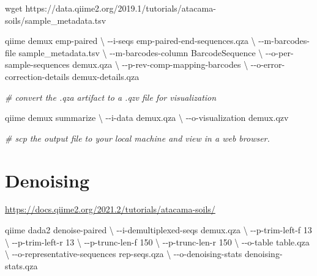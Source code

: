 \documentclass[
]{book}
\newenvironment{Shaded}{\begin{snugshade}}{\end{snugshade}}
\newcommand{\CommentTok}[1]{\textcolor[rgb]{0.56,0.35,0.01}{\textit{#1}}}
\newcommand{\DataTypeTok}[1]{\textcolor[rgb]{0.13,0.29,0.53}{#1}}
\newcommand{\ExtensionTok}[1]{#1}
\newcommand{\FunctionTok}[1]{\textcolor[rgb]{0.00,0.00,0.00}{#1}}
\newcommand{\NormalTok}[1]{#1}
\begin{document}
\begin{Shaded}
\begin{Highlighting}[]
\FunctionTok{wget}\NormalTok{ https://data.qiime2.org/2019.1/tutorials/atacama{-}soils/sample\_metadata.tsv}

\ExtensionTok{qiime}\NormalTok{ demux emp{-}paired }\DataTypeTok{\textbackslash{}}
\NormalTok{{-}{-}i{-}seqs emp{-}paired{-}end{-}sequences.qza }\DataTypeTok{\textbackslash{}}
\NormalTok{{-}{-}m{-}barcodes{-}file sample\_metadata.tsv }\DataTypeTok{\textbackslash{}}
\NormalTok{{-}{-}m{-}barcodes{-}column BarcodeSequence }\DataTypeTok{\textbackslash{}}
\NormalTok{{-}{-}o{-}per{-}sample{-}sequences demux.qza }\DataTypeTok{\textbackslash{}}
\NormalTok{{-}{-}p{-}rev{-}comp{-}mapping{-}barcodes }\DataTypeTok{\textbackslash{}}
\NormalTok{{-}{-}o{-}error{-}correction{-}details demux{-}details.qza}

\CommentTok{\# convert the .qza artifact to a .qzv file for visualization}

\ExtensionTok{qiime}\NormalTok{ demux summarize }\DataTypeTok{\textbackslash{}}
\NormalTok{{-}{-}i{-}data demux.qza }\DataTypeTok{\textbackslash{}}
\NormalTok{{-}{-}o{-}visualization demux.qzv}

\CommentTok{\# scp the output file to your local machine and view in a web browser.}
\end{Highlighting}
\end{Shaded}

\hypertarget{denoising}{%
\section{Denoising}\label{denoising}}

\url{https://docs.qiime2.org/2021.2/tutorials/atacama-soils/}

\begin{Shaded}
\begin{Highlighting}[]
\ExtensionTok{qiime}\NormalTok{ dada2 denoise{-}paired }\DataTypeTok{\textbackslash{} }  
\ExtensionTok{{-}{-}i{-}demultiplexed{-}seqs}\NormalTok{ demux.qza }\DataTypeTok{\textbackslash{} }  
\ExtensionTok{{-}{-}p{-}trim{-}left{-}f}\NormalTok{ 13 }\DataTypeTok{\textbackslash{}}
\NormalTok{{-}{-}p{-}trim{-}left{-}r 13 }\DataTypeTok{\textbackslash{}}
\NormalTok{{-}{-}p{-}trunc{-}len{-}f 150 }\DataTypeTok{\textbackslash{}}
\NormalTok{{-}{-}p{-}trunc{-}len{-}r 150 }\DataTypeTok{\textbackslash{}}
\NormalTok{{-}{-}o{-}table table.qza }\DataTypeTok{\textbackslash{}}
\NormalTok{{-}{-}o{-}representative{-}sequences rep{-}seqs.qza }\DataTypeTok{\textbackslash{}}
\NormalTok{{-}{-}o{-}denoising{-}stats denoising{-}stats.qza}
\end{Highlighting}
\end{Shaded}
\end{document}
